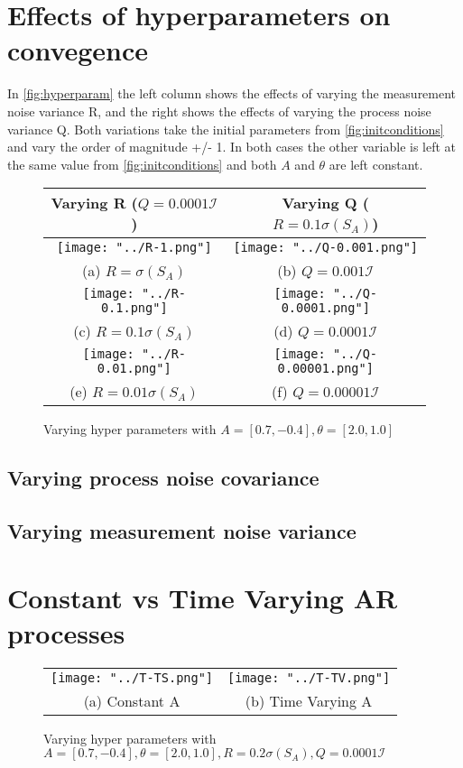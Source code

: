 \documentclass[sigconf]{acmart}
\begin{document}
\section{Effects of hyperparameters on convegence}
In \autoref{fig:hyperparam} the left column shows the effects of varying the measurement noise variance R, and the right shows the effects of varying the process noise variance Q. 
Both variations take the initial parameters from \autoref{fig:initconditions} and vary the order of magnitude +/- 1. In both cases the other variable is left at the same value from \autoref{fig:initconditions} and both $A$ and $\theta$ are left constant.
\begin{figure}[h]
  \centering
    \begin{tabular}{cc}
    \hline   
        Varying R ($Q = 0.0001\mathcal{I}$) & Varying Q ($R = 0.1\sigma(S_{A})$) \\
    \hline
      \texttt{[image: "../R-1.png"]} &   \texttt{[image: "../Q-0.001.png"]} \\
    (a) $R = \sigma(S_{A})$ & (b) $Q = 0.001\mathcal{I}$\\[6pt]
     \texttt{[image: "../R-0.1.png"]} &   \texttt{[image: "../Q-0.0001.png"]} \\
    (c) $R = 0.1\sigma(S_{A})$ & (d) $Q = 0.0001\mathcal{I}$\\[6pt]
    \texttt{[image: "../R-0.01.png"]} &   \texttt{[image: "../Q-0.00001.png"]} \\
    (e) $R = 0.01\sigma(S_{A})$ & (f) $Q = 0.00001\mathcal{I}$\\[6pt]
    \end{tabular}
    \caption{Varying hyper parameters with $A = [0.7, -0.4], \theta = [2.0, 1.0]$}
    \label{fig:hyperparam}
\end{figure}
\subsection{Varying process noise covariance}

\subsection{Varying measurement noise variance}

\section{Constant vs Time Varying AR processes}
\begin{figure}[h]
  \centering

    \begin{tabular}{cc}
    \texttt{[image: "../T-TS.png"]} &   \texttt{[image: "../T-TV.png"]} \\
    (a) Constant A & (b)  Time Varying A \\[6pt]
    \end{tabular}
    \caption{Varying hyper parameters with $A = [0.7, -0.4], \theta = [2.0, 1.0], R = 0.2\sigma(S_{A}), Q = 0.0001\mathcal{I}$}
\end{figure}
\end{document}
